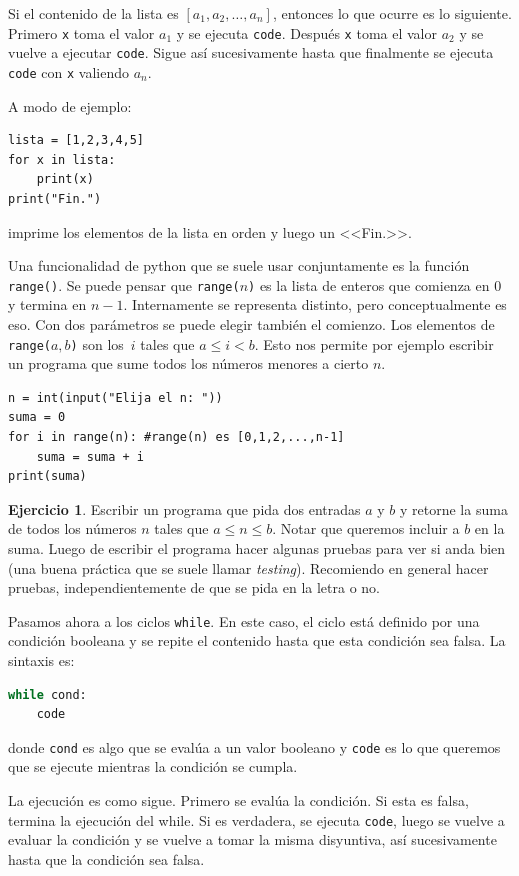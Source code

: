 \documentclass[a4paper, 12pt]{report}
\theoremstyle{definition}
\newtheorem{ejercicio}{Ejercicio}[section]
\begin{document}
Si el contenido de la lista es $[a_1,a_2,\dots,a_n]$, entonces lo que ocurre es lo siguiente. Primero {\tt x} toma el valor $a_1$ y se ejecuta {\tt code}. Después {\tt x} toma el valor $a_2$ y se vuelve a ejecutar {\tt code}. Sigue así sucesivamente hasta que finalmente se ejecuta {\tt code} con {\tt x} valiendo $a_n$.

A modo de ejemplo:
\begin{verbatim}
lista = [1,2,3,4,5]
for x in lista:
    print(x)
print("Fin.")
\end{verbatim}
imprime los elementos de la lista en orden y luego un <<Fin.>>.

Una funcionalidad de python que se suele usar conjuntamente es la función {\tt range()}. Se puede pensar que {\tt range($n$)} es la lista de enteros que comienza en $0$ y termina en $n-1$. Internamente se representa distinto, pero conceptualmente es eso. Con dos parámetros se puede elegir también el comienzo. Los elementos de {\tt range($a,b$)} son los~$i$ tales que $a\leq i<b$. Esto nos permite por ejemplo escribir un programa que sume todos los números menores a cierto $n$.
\begin{verbatim}
n = int(input("Elija el n: "))
suma = 0
for i in range(n): #range(n) es [0,1,2,...,n-1]
    suma = suma + i
print(suma)
\end{verbatim}
\begin{ejercicio}
	Escribir un programa que pida dos entradas $a$ y $b$ y retorne la suma de todos los números $n$ tales que $a\leq n\leq b$. Notar que queremos incluir a $b$ en la suma. Luego de escribir el programa hacer algunas pruebas para ver si anda bien (una buena práctica que se suele llamar {\sl testing}). Recomiendo en general hacer pruebas, independientemente de que se pida en la letra o no.
\end{ejercicio}

Pasamos ahora a los ciclos {\tt while}. En este caso, el ciclo está definido por una condición booleana y se repite el contenido hasta que esta condición sea falsa. La sintaxis es:
\begin{lstlisting}[language=python]
while cond:
    code
\end{lstlisting}
donde {\tt cond} es algo que se evalúa a un valor booleano y {\tt code} es lo que queremos que se ejecute mientras la condición se cumpla.

La ejecución es como sigue. Primero se evalúa la condición. Si esta es falsa, termina la ejecución del while. Si es verdadera, se ejecuta {\tt code}, luego se vuelve a evaluar la condición y se vuelve a tomar la misma disyuntiva, así sucesivamente hasta que la condición sea falsa.
\end{document}
